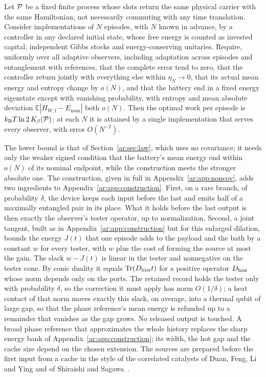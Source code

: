 \begin{theorem}\label{ar:thm:noncov}
Let $\mathcal P$ be a fixed finite process whose slots return the same physical carrier with the same Hamiltonian, not necessarily commuting with any time translation. Consider implementations of $N$ episodes, with $N$ known in advance, by a controller in any declared initial state, whose free energy is counted as invested capital, independent Gibbs stocks and energy-conserving unitaries. Require, uniformly over all adaptive observers, including adaptation across episodes and entanglement with references, that the complete error tend to zero, that the controller return jointly with everything else within $\eta_N\to0$, that its actual mean energy and entropy change by $o(N)$, and that the battery end in a fixed energy eigenstate except with vanishing probability, with entropy and mean absolute deviation $\mathbb E|H_{W,\mathrm f}-E_{\mathrm{nom}}|$ both $o(N)$. Then the optimal work per episode is $k_{\mathrm B} T\ln2\,K_\beta(\mathcal P)$; at each $N$ it is attained by a single implementation that serves every observer, with error $O(N^{-2})$.
\end{theorem}

The lower bound is that of Section~\ref{ar:sec:law}, which uses no covariance; it needs only the weaker signed condition that the battery's mean energy end within $o(N)$ of its nominal endpoint, while the construction meets the stronger absolute one. The construction, given in full in Appendix~\ref{ar:app:noncov}, adds two ingredients to Appendix~\ref{ar:app:construction}. First, on a rare branch, of probability $\delta$, the device keeps each input before the last and emits half of a maximally entangled pair in its place. What it holds before the last output is then exactly the observer's tester operator, up to normalization. Second, a joint tangent, built as in Appendix~\ref{ar:app:construction} but for this enlarged dilation, bounds the energy $J(t)$ that one episode adds to the payload and the bath by a constant $w$ for every tester, with $w$ plus the cost of forming the source at most the gain. The slack $w-J(t)$ is linear in the tester and nonnegative on the tester cone. By conic duality it equals $\operatorname{Tr}(D_{\rm hist}t)$ for a positive operator $D_{\rm hist}$ whose norm depends only on the ports. The retained record holds the tester only with probability $\delta$, so the correction it must apply has norm $O(1/\delta)$; a heat contact of that norm moves exactly this slack, on average, into a thermal qubit of large gap, so that the phase reference's mean energy is refunded up to a remainder that vanishes as the gap grows. No released output is touched. A broad phase reference that approximates the whole history replaces the sharp energy bank of Appendix~\ref{ar:app:construction}; its width, the hot gap and the cache size depend on the chosen extension. The sources are prepared before the first input from a cache in the style of the correlated catalysts of Duan, Feng, Li and Ying and of Shiraishi and Sagawa~\cite{Duan05,ShiraishiSagawa21}.

